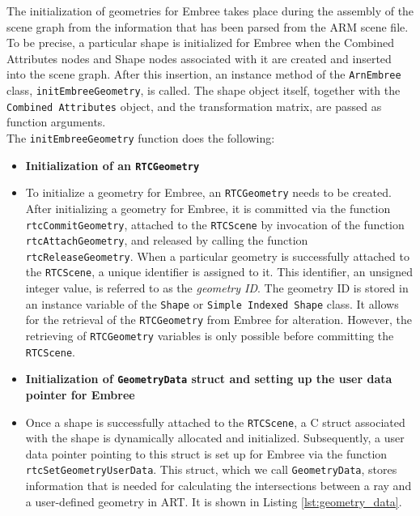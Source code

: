 The initialization of geometries for Embree takes place during the assembly of the scene graph from the information that has been parsed from the ARM scene file. To be precise, a particular shape is initialized for Embree when the Combined Attributes nodes and Shape nodes associated with it are created and inserted into the scene graph. After this insertion, an instance method of the \texttt{ArnEmbree} class, \texttt{initEmbreeGeometry}, is called. The shape object itself, together with the \texttt{Combined Attributes} object, and the transformation matrix, are passed as function arguments. 
\\

The \texttt{initEmbreeGeometry} function does the following:

\begin{itemize}
	\setlength\itemsep{0.05em}
	
	\item \textbf{Initialization of an \texttt{RTCGeometry}}
	\item[] To initialize a geometry for Embree, an \texttt{RTCGeometry} needs to be created. After initializing a geometry for Embree, it is committed via the function \texttt{rtcCommitGeometry}, attached to the \texttt{RTCScene} by invocation of the function \texttt{rtcAttachGeometry}, and released by calling the function \texttt{rtcReleaseGeometry}. When a particular geometry is successfully attached to the \texttt{RTCScene}, a unique identifier is assigned to it. This identifier, an unsigned integer value, is referred to as the \emph{geometry ID}. The geometry ID is stored in an instance variable of the \texttt{Shape} or \texttt{Simple Indexed Shape} class. It allows for the retrieval of the \texttt{RTCGeometry} from Embree for alteration. However, the retrieving of \texttt{RTCGeometry} variables is only possible before committing the \texttt{RTCScene}. 
	\\
	
	\item \textbf{Initialization of \texttt{GeometryData} struct and setting up the user data pointer for Embree}
	\item[] Once a shape is successfully attached to the \texttt{RTCScene}, a C struct associated with the shape is dynamically allocated and initialized. Subsequently, a user data pointer pointing to this struct is set up for Embree via the function \texttt{rtcSetGeometryUserData}. This struct, which we call \texttt{GeometryData}, stores information that is needed for calculating the intersections between a ray and a user-defined geometry in ART. It is shown in Listing \ref{lst:geometry_data}.
	\\
	
\end{itemize}

